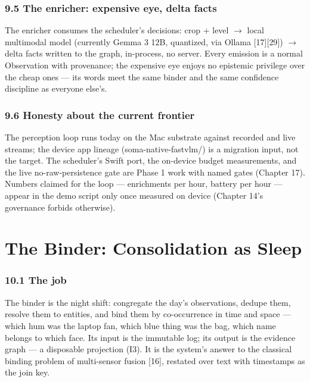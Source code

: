 \subsection{9.5 The enricher: expensive eye, delta facts}\label{the-enricher-expensive-eye-delta-facts}

The enricher consumes the scheduler's decisions: crop + level \(\rightarrow\) local multimodal model (currently Gemma 3 12B, quantized, via Ollama {[}17{]}{[}29{]}) \(\rightarrow\) delta facts written to the graph, in-process, no server. Every emission is a normal Observation with provenance; the expensive eye enjoys no epistemic privilege over the cheap ones --- its words meet the same binder and the same confidence discipline as everyone else's.

\subsection{9.6 Honesty about the current frontier}\label{honesty-about-the-current-frontier}

The perception loop runs today on the Mac substrate against recorded and live streams; the device app lineage (soma-native-fastvlm/) is a migration input, not the target. The scheduler's Swift port, the on-device budget measurements, and the live no-raw-persistence gate are Phase 1 work with named gates (Chapter 17). Numbers claimed for the loop --- enrichments per hour, battery per hour --- appear in the demo script only once measured on device (Chapter 14's governance forbids otherwise).

\chapter{The Binder: Consolidation as Sleep}\label{the-binder-consolidation-as-sleep}

\subsection{10.1 The job}\label{the-job}

The binder is the night shift: congregate the day's observations, dedupe them, resolve them to entities, and bind them by co-occurrence in time and space --- which hum was the laptop fan, which blue thing was the bag, which name belongs to which face. Its input is the immutable log; its output is the evidence graph --- a disposable projection (I3). It is the system's answer to the classical binding problem of multi-sensor fusion {[}16{]}, restated over text with timestamps as the join key.


